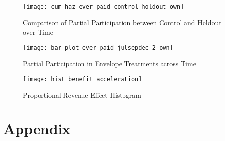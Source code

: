 \documentclass[12pt,titlepage]{article}
\begin{document}
\begin{figure}[htpb]
\begin{center}
\caption{Comparison of Partial Participation between Control and Holdout over Time}
\label{fig:ep_time_ch_own}
\bigskip
\texttt{[image: cum\_haz\_ever\_paid\_control\_holdout\_own]}
\end{center}
\end{figure}

\begin{figure}[htpb]
\begin{center}
\caption{Partial Participation in Envelope Treatments across Time}
\label{fig:ep_time_2_own}
\bigskip
\texttt{[image: bar\_plot\_ever\_paid\_julsepdec\_2\_own]}
\end{center}
\end{figure}

\begin{figure}[htpb]
\begin{center}
\caption{Proportional Revenue Effect Histogram}
\label{fig:rev_prop}
\bigskip
\texttt{[image: hist\_benefit\_acceleration]}
\end{center}
\end{figure}

\section{Appendix}

\end{document}
